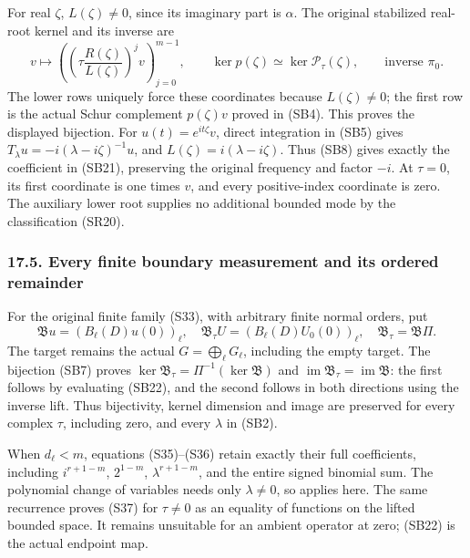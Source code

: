 \documentclass[
  11pt,
]{article}
\begin{document}
For real \(\zeta\), \(L(\zeta)\ne0\), since its imaginary part is
\(\alpha\). The original stabilized real-root kernel and its inverse are
\[
 v\longmapsto
       \left(\left(\tau\frac{R(\zeta)}{L(\zeta)}\right)^jv
                         \right)_{j=0}^{m-1},
 \qquad
 \ker p(\zeta)\simeq\ker\mathcal P_\tau(\zeta),
 \qquad\text{inverse }\pi_0.
 \tag{SB21}
\] The lower rows uniquely force these coordinates because
\(L(\zeta)\ne0\); the first row is the actual Schur complement
\(p(\zeta)v\) proved in (SB4). This proves the displayed bijection. For
\(u(t)=e^{it\zeta}v\), direct integration in (SB5) gives
\(T_\lambda u=-i(\lambda-i\zeta)^{-1}u\), and
\(L(\zeta)=i(\lambda-i\zeta)\). Thus (SB8) gives exactly the coefficient
in (SB21), preserving the original frequency and factor \(-i\). At
\(\tau=0\), its first coordinate is one times \(v\), and every
positive-index coordinate is zero. The auxiliary lower root supplies no
additional bounded mode by the classification (SR20).

\subsubsection{17.5. Every finite boundary measurement and its ordered
remainder}\label{every-finite-boundary-measurement-and-its-ordered-remainder}

For the original finite family (S33), with arbitrary finite normal
orders, put \[
 \mathfrak B u=(B_\ell(D)u(0))_\ell,
 \quad\mathfrak B_\tau U=(B_\ell(D)U_0(0))_\ell,
 \quad\mathfrak B_\tau=\mathfrak B\Pi.
 \tag{SB22}
\] The target remains the actual \(G=\bigoplus_\ell G_\ell\), including
the empty target. The bijection (SB7) proves
\(\ker\mathfrak B_\tau=\Pi^{-1}(\ker\mathfrak B)\) and
\(\operatorname{im}\mathfrak B_\tau=\operatorname{im}\mathfrak B\): the
first follows by evaluating (SB22), and the second follows in both
directions using the inverse lift. Thus bijectivity, kernel dimension
and image are preserved for every complex \(\tau\), including zero, and
every \(\lambda\) in (SB2).

When \(d_\ell<m\), equations (S35)--(S36) retain exactly their full
coefficients, including \(i^{r+1-m}\), \(2^{1-m}\), \(\lambda^{r+1-m}\),
and the entire signed binomial sum. The polynomial change of variables
needs only \(\lambda\ne0\), so applies here. The same recurrence proves
(S37) for \(\tau\ne0\) as an equality of functions on the lifted bounded
space. It remains unsuitable for an ambient operator at zero; (SB22) is
the actual endpoint map.
\end{document}
